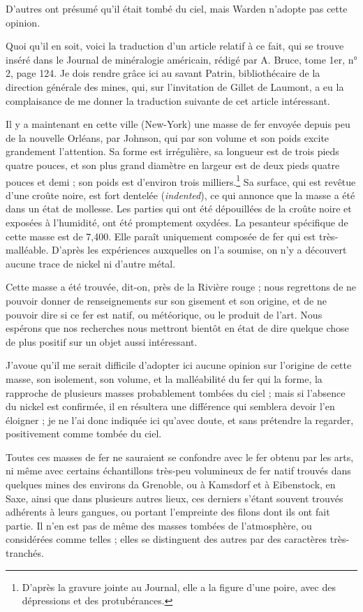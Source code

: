 \documentclass[a4paper, 12pt, oneside, french]{article}
\begin{document}
D'autres ont présumé qu'il était tombé du ciel, mais Warden n'adopte pas cette opinion.

Quoi qu'il en soit, voici la traduction d'un article relatif à ce fait, qui se trouve inséré dans le Journal de minéralogie américain, rédigé par A. Bruce, tome 1er, n° 2, page 124. Je dois rendre grâce ici au savant Patrin, bibliothécaire de la direction générale des mines, qui, sur l'invitation de Gillet de Laumont, a eu la complaisance de me donner la traduction suivante de cet article intéressant.

\og Il y a maintenant en cette ville (New-York) une masse de fer envoyée depuis peu de la nouvelle Orléans, par Johnson, qui par son volume et son poids excite grandement l'attention. Sa forme est irrégulière, sa longueur est de trois pieds quatre pouces, et son plus grand diamètre en largeur est de deux pieds quatre pouces et demi ; son poids est d'environ trois milliers.\footnote{D'après la gravure jointe au Journal, elle a la figure d'une poire, avec des dépressions et des protubérances.} Sa surface, qui est revêtue d'une croûte noire, est fort dentelée (\emph{indented}), ce qui annonce que la masse a été dans un état de mollesse. Les parties qui ont été dépouillées de la croûte noire et exposées à l'humidité, ont été promptement oxydées. La pesanteur spécifique de cette masse est de 7,400. Elle paraît uniquement composée de fer qui est très-malléable. D'après les expériences auxquelles on l'a soumise, on n'y a découvert aucune trace de nickel ni d'autre métal. \fg

\og Cette masse a été trouvée, dit-on, près de la Rivière rouge ; nous regrettons de ne pouvoir donner de renseignements sur son gisement et son origine, et de ne pouvoir dire si ce fer est natif, ou météorique, ou le produit de l'art. Nous espérons que nos recherches nous mettront bientôt en état de dire quelque chose de plus positif sur un objet aussi intéressant. \fg

J'avoue qu'il me serait difficile d'adopter ici aucune opinion sur l'origine de cette masse, son isolement, son volume, et la malléabilité du fer qui la forme, la rapproche de plusieurs masses probablement tombées du ciel ; mais si l'absence du nickel est confirmée, il en résultera une différence qui semblera devoir l'en éloigner ; je ne l'ai donc indiquée ici qu'avec doute, et sans prétendre la regarder, positivement comme tombée du ciel.

Toutes ces masses de fer ne sauraient se confondre avec le fer obtenu par les arts, ni même avec certains échantillons très-peu volumineux de fer natif trouvés dans quelques mines des environs da Grenoble, ou à Kamsdorf et à Eibenstock, en Saxe, ainsi que dans plusieurs autres lieux, ces derniers s'étant souvent trouvés adhérents à leurs gangues, ou portant l'empreinte des filons dont ils ont fait partie. Il n'en est pas de même des masses tombées de l'atmosphère, ou considérées comme telles ; elles se distinguent des autres par des caractères très-tranchés.
\end{document}
